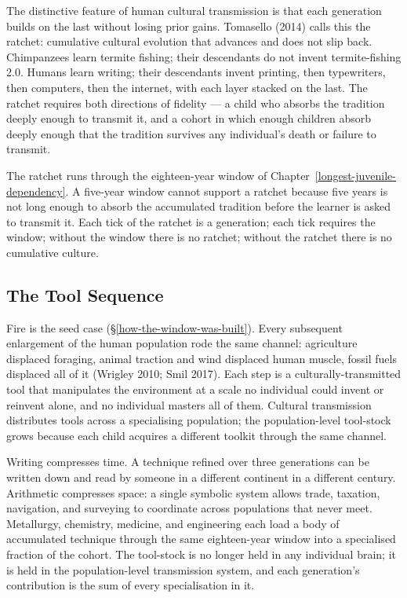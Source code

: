 \documentclass[12pt,letterpaper]{article}
\begin{document}
The distinctive feature of human cultural transmission is that each
generation builds on the last without losing prior gains. Tomasello
(2014) calls this the ratchet: cumulative cultural evolution that
advances and does not slip back. Chimpanzees learn termite fishing;
their descendants do not invent termite-fishing 2.0. Humans learn
writing; their descendants invent printing, then typewriters, then
computers, then the internet, with each layer stacked on the last.
The ratchet requires both directions of fidelity --- a child who
absorbs the tradition deeply enough to transmit it, and a cohort in
which enough children absorb deeply enough that the tradition
survives any individual's death or failure to transmit.

The ratchet runs through the eighteen-year window of
Chapter~\ref{longest-juvenile-dependency}. A five-year window cannot
support a ratchet because five years is not long enough to absorb
the accumulated tradition before the learner is asked to transmit it.
Each tick of the ratchet is a generation; each tick requires the
window; without the window there is no ratchet; without the ratchet
there is no cumulative culture.

\subsection{The Tool Sequence}\label{the-tool-sequence}

Fire is the seed case (\S\ref{how-the-window-was-built}). Every
subsequent enlargement of the human population rode the same channel:
agriculture displaced foraging, animal traction and wind displaced
human muscle, fossil fuels displaced all of it (Wrigley 2010; Smil
2017). Each step is a culturally-transmitted tool that manipulates
the environment at a scale no individual could invent or reinvent
alone, and no individual masters all of them. Cultural transmission
distributes tools across a specialising population; the
population-level tool-stock grows because each child acquires a
different toolkit through the same channel.

Writing compresses time. A technique refined over three generations
can be written down and read by someone in a different continent in a
different century. Arithmetic compresses space: a single symbolic
system allows trade, taxation, navigation, and surveying to
coordinate across populations that never meet. Metallurgy, chemistry,
medicine, and engineering each load a body of accumulated technique
through the same eighteen-year window into a specialised fraction of
the cohort. The tool-stock is no longer held in any individual brain;
it is held in the population-level transmission system, and each
generation's contribution is the sum of every specialisation in it.
\end{document}
